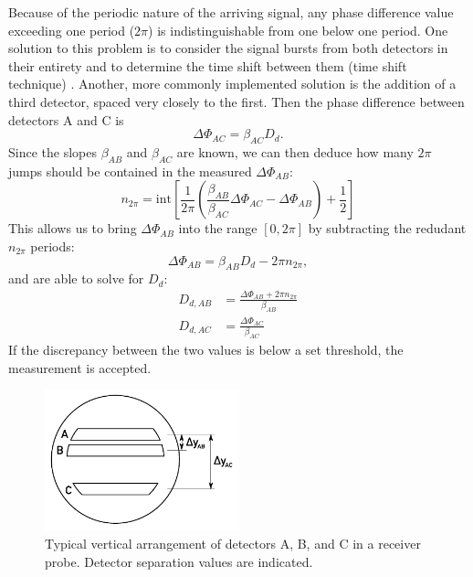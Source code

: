 \documentclass[11.5pt,oneside]{book}
\begin{document}
Because of the periodic nature of the arriving signal, any phase difference value
exceeding one period ($2\pi$) is indistinguishable from one below one period.
One solution to this problem is to consider the signal bursts from both
detectors in their entirety and to determine the time shift between them (time
shift technique) \cite{Albrecht03}. Another, more commonly implemented solution
is the addition of a third detector, spaced very closely to the first. Then the
phase difference between detectors A and C is
\begin{equation}
    \Delta \Phi_{AC} = \beta_{AC} D_d.
\end{equation}
Since the slopes $\beta_{AB}$ and $\beta_{AC}$ are known, we can then deduce how
many $2\pi$ jumps should be contained in the measured $\Delta \Phi_{AB}$:
\begin{equation}
    n_{2\pi} = \mathrm{int}\left[
        \frac{1}{2\pi}\left(\frac{\beta_{AB}}{\beta_{AC}} \Delta \Phi_{AC} -
    \Delta\Phi_{AB} \right) + \frac{1}{2}\right]
\end{equation}
This allows us to bring $\Delta\Phi_{AB}$ into the range $[0, 2\pi]$ by
subtracting the redudant $n_{2\pi}$ periods:
\begin{equation}
    \Delta\Phi_{AB} = \beta_{AB} D_d - 2\pi n_{2\pi},
\end{equation}
and are able to solve for $D_d$:
\begin{align}
    D_{d,AB} &= \frac{\Delta\Phi_{AB} + 2\pi n_{2\pi}}{\beta_{AB}}\\
    D_{d,AC} &= \frac{\Delta\Phi_{AC}}{\beta_{AC}}
\end{align}
If the discrepancy between the two values is below a set threshold, the
measurement is accepted.

\begin{figure}
    \centering
    \includegraphics[width=0.5\textwidth]{img/setup/detector_arrangement.pdf}
    \caption{Typical vertical arrangement of detectors A, B, and C in a receiver
        probe. Detector separation values are indicated. \label{fig:pdpa-detector-arrangement}}
\end{figure}
\end{document}
